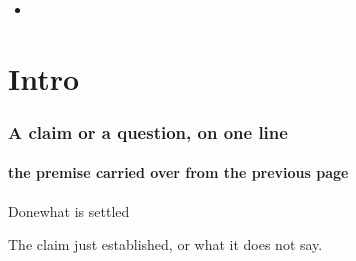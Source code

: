 \documentclass[aspectratio=169,11pt,t]{beamer}
\begin{document}
\begin{frame}[plain]\end{frame}
\begin{frame}\frametitle{}\begin{itemize}\item {}\end{itemize}\end{frame}
\section{Intro}
\begin{frame}
\frametitle{A claim or a question, on one line}
\framesubtitle{the premise carried over from the previous page}
\begin{tbox}{Done}\small what is settled\end{tbox}
\closing[Next: the question the next page answers.]{The claim just established, or what it does not say.}
\end{frame}
\end{document}
